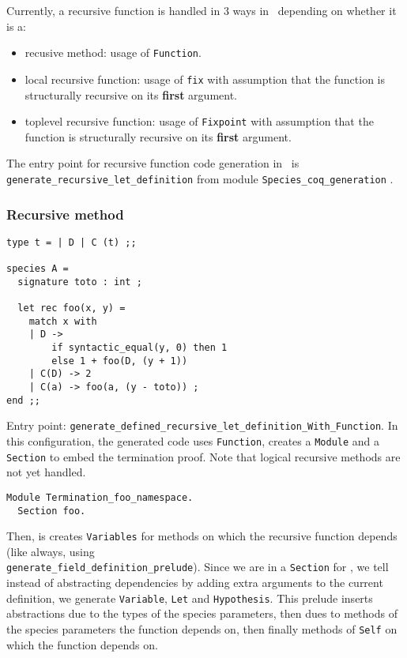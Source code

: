 Currently, a recursive function is handled in 3 ways in \coq\ depending
on whether it is a:
\begin{itemize}
  \item recusive method: usage of {\tt Function}.
  \item local recursive function: usage of {\tt fix} with assumption
  that the function is structurally recursive on its {\bf first} argument.
  \item toplevel recursive function: usage of {\tt Fixpoint} with assumption
  that the function is structurally recursive on its {\bf first} argument.
\end{itemize}

The entry point for recursive function code generation in \coq\ is
{\tt generate\_recursive\_let\_definition} from module {\tt Species\_coq\_generation} .


\subsubsection{Recursive method}
{\footnotesize
\begin{lstlisting}
type t = | D | C (t) ;;

species A =
  signature toto : int ;

  let rec foo(x, y) =
    match x with
    | D ->
        if syntactic_equal(y, 0) then 1
        else 1 + foo(D, (y + 1))
    | C(D) -> 2
    | C(a) -> foo(a, (y - toto)) ;
end ;;
\end{lstlisting}
}

Entry point: {\tt generate\_defined\_recursive\_let\_definition\_With\_Function}.
In this configuration, the generated code uses {\tt Function}, creates
a {\tt Module} and a {\tt Section} to embed the termination
proof. Note that logical recursive methods are not yet handled.

{\footnotesize
\begin{lstlisting}[language=MyCoq]
Module Termination_foo_namespace.
  Section foo.
\end{lstlisting}
}

Then, is creates {\tt Variables} for methods on which the recursive
function depends (like always, using \\
{\tt generate\_field\_definition\_prelude}). Since we are in a {\tt Section}
for \zenon, we tell instead of abstracting dependencies by adding
extra arguments to  the current definition, we generate {\tt Variable},
{\tt Let} and {\tt Hypothesis}. This prelude inserts abstractions due
to the types of the species parameters, then dues to methods of the
species parameters the function depends on, then finally methods of
{\tt Self} on which the function depends on.

